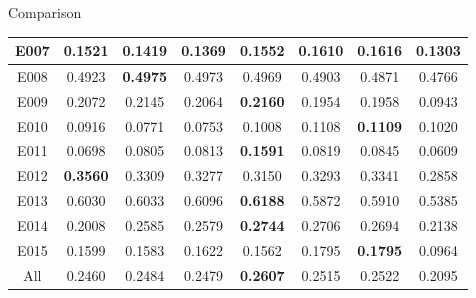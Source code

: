 \documentclass{beamer}
\begin{document}
\begin{frame}[t]{Comparison}
\begin{table}
{\begin{tabular}{|c|c|c|c|c|c|c|c|}
    E007  & \multicolumn{1}{|c|}{0.1521} & 0.1419 & \multicolumn{1}{|c|}{0.1369} & 0.1552 & 0.1610 & \multicolumn{1}{|c|}{\textbf{0.1616}} & 0.1303 \\	\hline
    E008  & \multicolumn{1}{|c|}{0.4923} & \textbf{0.4975} & \multicolumn{1}{|c|}{0.4973} & 0.4969 & 0.4903 & \multicolumn{1}{|c|}{0.4871} & 0.4766 \\	\hline
    E009  & \multicolumn{1}{|c|}{0.2072} & 0.2145 & \multicolumn{1}{|c|}{0.2064} & \textbf{0.2160} & 0.1954 & \multicolumn{1}{|c|}{0.1958} & 0.0943 \\	\hline
    E010  & \multicolumn{1}{|c|}{0.0916} & 0.0771 & \multicolumn{1}{|c|}{0.0753} & 0.1008 & 0.1108 & \multicolumn{1}{|c|}{\textbf{0.1109}} & 0.1020 \\	\hline
    E011  & \multicolumn{1}{|c|}{0.0698} & 0.0805 & \multicolumn{1}{|c|}{0.0813} & \textbf{0.1591} & 0.0819 & \multicolumn{1}{|c|}{0.0845} & 0.0609 \\	\hline
    E012  & \multicolumn{1}{|c|}{\textbf{0.3560}} & 0.3309 & \multicolumn{1}{|c|}{0.3277} & 0.3150 & 0.3293 & \multicolumn{1}{|c|}{0.3341} & 0.2858 \\	\hline
    E013  & \multicolumn{1}{|c|}{0.6030} & 0.6033 & \multicolumn{1}{|c|}{0.6096} & \textbf{0.6188} & 0.5872 & \multicolumn{1}{|c|}{0.5910} & 0.5385 \\	\hline
    E014  & \multicolumn{1}{|c|}{0.2008} & 0.2585 & \multicolumn{1}{|c|}{0.2579} & \textbf{0.2744} & 0.2706 & \multicolumn{1}{|c|}{0.2694} & 0.2138 \\	\hline
    E015  & \multicolumn{1}{|c|}{0.1599} & 0.1583 & \multicolumn{1}{|c|}{0.1622} & 0.1562 & 0.1795 & \multicolumn{1}{|c|}{\textbf{0.1795}} & 0.0964 \\	\hline
    All   & \multicolumn{1}{|c|}{0.2460} & 0.2484 & \multicolumn{1}{|c|}{0.2479} & \textbf{0.2607} & 0.2515 & \multicolumn{1}{|c|}{0.2522} & 0.2095 \\	\hline

    \end{tabular}}%
  \label{tab:addlabel}%
\end{table}%
\end{frame}

\end{document}
